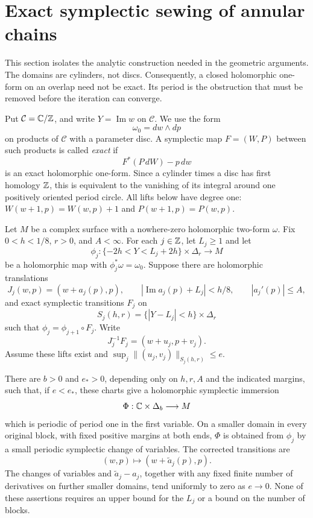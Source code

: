 \section{Exact symplectic sewing of annular chains}
\label{sew:section}

This section isolates the analytic construction needed in the geometric
arguments.  The domains are cylinders, not discs.  Consequently, a closed
holomorphic one-form on an overlap need not be exact.  Its period is the
obstruction that must be removed before the iteration can converge.

Put $\mathcal C=\mathbb C/\mathbb Z$, and write $Y=\operatorname{Im}w$ on
$\mathcal C$.  We use the form
\[
                 \omega_0=dw\wedge dp
\]
on products of $\mathcal C$ with a parameter disc.  A symplectic map
$F=(W,P)$ between such products is called \emph{exact} if
\[
                F^*(P\,dW)-p\,dw
\]
is an exact holomorphic one-form.  Since a cylinder times a disc has first
homology $\mathbb Z$, this is equivalent to the vanishing of its integral around
one positively oriented period circle.  All lifts below have degree one:
$W(w+1,p)=W(w,p)+1$ and $P(w+1,p)=P(w,p)$.

\begin{theorem}\label{sew:chain}
Let $M$ be a complex surface with a nowhere-zero holomorphic two-form
$\omega$.  Fix $0<h<1/8$, $r>0$, and $A<\infty$.  For each $j\in\mathbb Z$,
let $L_j\geq1$ and let
\[
 \phi_j:\{ -2h<Y<L_j+2h\}\times\Delta_r\longrightarrow M
\]
be a holomorphic map with $\phi_j^*\omega=\omega_0$.  Suppose there are
holomorphic translations
\[
 J_j(w,p)=(w+a_j(p),p),\qquad
 |\operatorname{Im}a_j(p)+L_j|<h/8,\qquad |a_j'(p)|\leq A,
\]
and exact symplectic transitions $F_j$ on
\[
 S_j(h,r)=\{|Y-L_j|<h\}\times\Delta_r
\]
such that $\phi_j=\phi_{j+1}\circ F_j$.  Write
\[
                  J_j^{-1}F_j=(w+u_j,p+v_j).
\]
Assume these lifts exist and
$\sup_j\|(u_j,v_j)\|_{S_j(h,r)}\leq e$.

There are $b>0$ and $e_*>0$, depending only on $h,r,A$ and the indicated margins,
such that, if $e<e_*$, these charts give a holomorphic symplectic
immersion
\[
                  \Phi:\mathbb C\times\Delta_b\longrightarrow M
\]
which is periodic of period one in the first variable.
On a smaller domain in every original block, with fixed positive
margins at both ends, $\Phi$ is obtained from $\phi_j$ by a small
periodic symplectic change of variables.  The corrected transitions are
\[
        (w,p)\longmapsto(w+\widetilde a_j(p),p).
\]
The changes of variables and $\widetilde a_j-a_j$, together with any
fixed finite number of derivatives on further smaller domains, tend
uniformly to zero as $e\to0$.  None of these assertions requires an
upper bound for the $L_j$ or a bound on the number of blocks.
\end{theorem}

